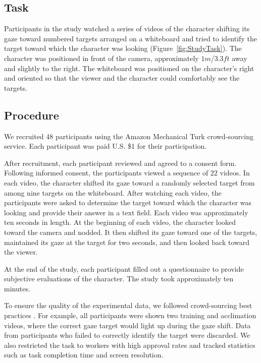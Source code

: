 \subsection{Task}

Participants in the study watched a series of videos of the character shifting its gaze toward numbered targets arranged on a whiteboard and tried to identify the target toward which the character was looking (Figure~\ref{fig:StudyTask}). The character was positioned in front of the camera, approximately $1 m$/$3.3 ft$ away and slightly to the right. The whiteboard was positioned on the character's right and oriented so that the viewer and the character could comfortably see the targets.

\subsection{Procedure}

We recruited 48 participants using the Amazon Mechanical Turk crowd-sourcing service. Each participant was paid U.S. \$1 for their participation.

After recruitment, each participant reviewed and agreed to a consent form. Following informed consent, the participants viewed a sequence of $22$ videos. In each video, the character shifted its gaze toward a randomly selected target from among nine targets on the whiteboard. After watching each video, the participants were asked to determine the target toward which the character was looking and provide their answer in a text field. Each video was approximately ten seconds in length. At the beginning of each video, the character looked toward the camera and nodded. It then shifted its gaze toward one of the targets, maintained its gaze at the target for two seconds, and then looked back toward the viewer.

At the end of the study, each participant filled out a questionnaire to provide subjective evaluations of the character. The study took approximately ten minutes.

To ensure the quality of the experimental data, we followed crowd-sourcing best practices \cite{kittur2008mturk}. For example, all participants were shown two training and acclimation videos, where the correct gaze target would light up during the gaze shift. Data from participants who failed to correctly identify the target were discarded. We also restricted the task to workers with high approval rates and tracked statistics such as task completion time and screen resolution.


